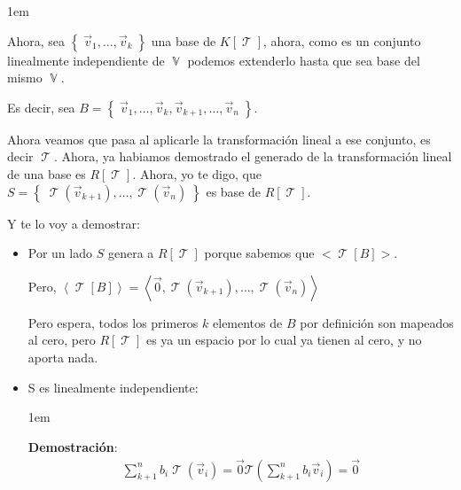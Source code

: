 \documentclass[12pt, fleqn]{report}                             %
\newenvironment{SmallIndentation}[1][0.75em]                    %
        {\begin{adjustwidth}{#1}{}\begin{footnotesize}}             %
        {\end{footnotesize}\end{adjustwidth}}                       %
\theoremstyle{break}                                            %
\DeclareMathOperator \VectorSet    {\mathbb{V}}                 %
\DeclareMathOperator \LinTrans      {\mathcal{T}}               %
\newcommand{\Set}[1]            {\left\{ \; #1 \; \right\}}     %
\newcommand{\Wrap}[1]           {\left( #1 \right)}             %
\newcommand{\Generate}[1]   {\left\langle #1 \right\rangle}     %
\newcommand{\FnLinTrans}[1]{\mathcal{T}\Wrap{#1}}               %
\begin{document}
\begin{itemize}
\begin{SmallIndentation}[1em]
                            Ahora, sea $\Set{\vec v_1, \dots, \vec v_k}$ una base de $K[\LinTrans]$, ahora, como es un conjunto
                            linealmente independiente de $\VectorSet$ podemos extenderlo hasta que sea base del mismo
                            $\VectorSet$.

                            Es decir, sea $B = \Set{\vec v_1, \dots, \vec v_k, \vec v_{k+1}, \dots, \vec v_n}$.

                            Ahora veamos que pasa al aplicarle la transformación lineal a ese conjunto, es
                            decir $\LinTrans$.
                            Ahora, ya habiamos demostrado el generado de la transformación lineal de una base
                            es $R[\LinTrans]$.
                            Ahora, yo te digo, que $S = \Set{ \LinTrans(\vec v_{k+1}), \dots, \LinTrans(\vec v_n)}$
                            es base de $R[\LinTrans]$.

                            Y te lo voy a demostrar:
                            \begin{itemize}
                                \item 
                                    Por un lado $S$ genera a $R[\LinTrans]$ porque sabemos que $<\LinTrans[B]>$.

                                    Pero, 
                                    $\Generate{\LinTrans[B]} 
                                        = \Generate{\vec 0, \LinTrans(\vec v_{k+1}), \dots, \LinTrans(\vec v_n)}$

                                    Pero espera, todos los primeros $k$ elementos de $B$ por definición son mapeados
                                    al cero, pero $R[\LinTrans]$ es ya un espacio por lo cual ya tienen al cero, y no 
                                    aporta nada.

                                \item
                                    S es linealmente independiente:

                                    \begin{SmallIndentation}[1em]
                                        \textbf{Demostración}:
                                        \begin{align*}
                                            \sum_{k+1}^n b_i \LinTrans(\vec v_i) = \vec 0
                                            \FnLinTrans{\sum_{k+1}^n b_i \vec v_i} = \vec 0
                                        \end{align*}


\end{SmallIndentation}
\end{itemize}
\end{SmallIndentation}
\end{itemize}
\end{document}
